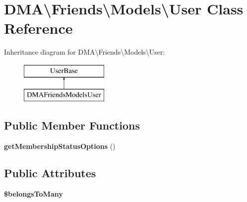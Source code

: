 \hypertarget{classDMA_1_1Friends_1_1Models_1_1User}{\section{D\+M\+A\textbackslash{}Friends\textbackslash{}Models\textbackslash{}User Class Reference}
\label{classDMA_1_1Friends_1_1Models_1_1User}
}
Inheritance diagram for D\+M\+A\textbackslash{}Friends\textbackslash{}Models\textbackslash{}User\+:\begin{figure}[H]
\begin{center}
\leavevmode
\includegraphics[height=2.000000cm]{da/dbf/classDMA_1_1Friends_1_1Models_1_1User}
\end{center}
\end{figure}
\subsection*{Public Member Functions}
\begin{DoxyCompactItemize}
\item 
\hypertarget{classDMA_1_1Friends_1_1Models_1_1User_a4d122bc16511e65e703d5d2dfb75808b}{{\bfseries get\+Membership\+Status\+Options} ()}\label{classDMA_1_1Friends_1_1Models_1_1User_a4d122bc16511e65e703d5d2dfb75808b}

\end{DoxyCompactItemize}
\subsection*{Public Attributes}
\begin{DoxyCompactItemize}
\item 
{\bfseries \$belongs\+To\+Many}
\end{DoxyCompactItemize}


